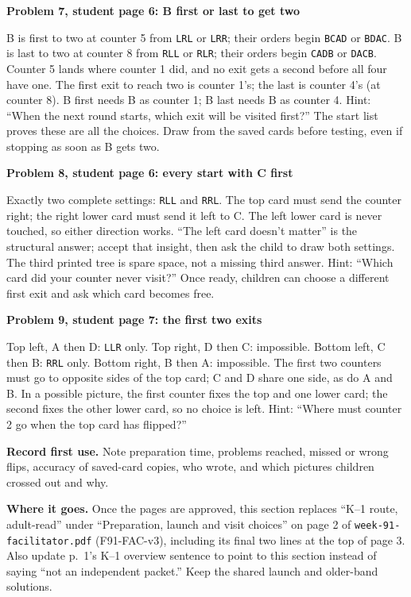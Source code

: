 \documentclass[11pt]{article}
\newcommand{\sub}[1]{\par\textbf{#1}\par}
\newcommand{\code}[1]{\texttt{#1}}
\begin{document}
\sub{Problem 7, student page 6: B first or last to get two}
B is first to two at counter 5 from \code{LRL} or \code{LRR}; their orders begin \code{BCAD} or \code{BDAC}. B is last to two at counter 8 from \code{RLL} or \code{RLR}; their orders begin \code{CADB} or \code{DACB}. Counter 5 lands where counter 1 did, and no exit gets a second before all four have one. The first exit to reach two is counter 1's; the last is counter 4's (at counter 8). B first needs B as counter 1; B last needs B as counter 4. Hint: ``When the next round starts, which exit will be visited first?'' The start list proves these are all the choices. Draw from the saved cards before testing, even if stopping as soon as B gets two.

\sub{Problem 8, student page 6: every start with C first}
Exactly two complete settings: \code{RLL} and \code{RRL}. The top card must send the counter right; the right lower card must send it left to C. The left lower card is never touched, so either direction works. ``The left card doesn't matter'' is the structural answer; accept that insight, then ask the child to draw both settings. The third printed tree is spare space, not a missing third answer. Hint: ``Which card did your counter never visit?'' Once ready, children can choose a different first exit and ask which card becomes free.

\sub{Problem 9, student page 7: the first two exits}
Top left, A then D: \code{LLR} only. Top right, D then C: impossible. Bottom left, C then B: \code{RRL} only. Bottom right, B then A: impossible. The first two counters must go to opposite sides of the top card; C and D share one side, as do A and B. In a possible picture, the first counter fixes the top and one lower card; the second fixes the other lower card, so no choice is left. Hint: ``Where must counter 2 go when the top card has flipped?''

\textbf{Record first use.} Note preparation time, problems reached, missed or wrong flips, accuracy of saved-card copies, who wrote, and which pictures children crossed out and why.

\textbf{Where it goes.} Once the pages are approved, this section replaces ``K--1 route, adult-read'' under ``Preparation, launch and visit choices'' on page 2 of \code{week-91-facilitator.pdf} (F91-FAC-v3), including its final two lines at the top of page 3. Also update p.\ 1's K--1 overview sentence to point to this section instead of saying ``not an independent packet.'' Keep the shared launch and older-band solutions.
\end{document}
